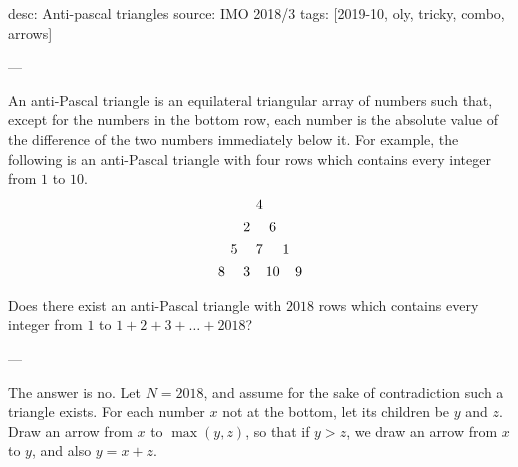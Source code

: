 desc: Anti-pascal triangles
source: IMO 2018/3
tags: [2019-10, oly, tricky, combo, arrows]

---

An anti-Pascal triangle is an equilateral triangular array of numbers such that, except for the numbers in the bottom row, each number is the absolute value of the difference of the two numbers immediately below it. For example, the following is an anti-Pascal triangle with four rows which contains every integer from $1$ to $10$.
\[\begin{array}{
            c@{\hspace{4pt}}c@{\hspace{4pt}}
            c@{\hspace{4pt}}c@{\hspace{2pt}}c@{\hspace{2pt}}c@{\hspace{4pt}}c
        } \vspace{4pt}
        & & & 4 & & &  \\\vspace{4pt}
        & & 2 & & 6 & &  \\\vspace{4pt}
        & 5 & & 7 & & 1 & \\\vspace{4pt}
        8 & & 3 & & 10 & & 9
\end{array}\]
Does there exist an anti-Pascal triangle with $2018$ rows which contains every integer from $1$ to $1+2+3+\ldots+2018$?

---

The answer is no. Let $N=2018$, and assume for the sake of contradiction such a triangle exists. For each number $x$ not at the bottom, let its children be $y$ and $z$. Draw an arrow from $x$ to $\max(y,z)$, so that if $y>z$, we draw an arrow from $x$ to $y$, and also $y=x+z$.


